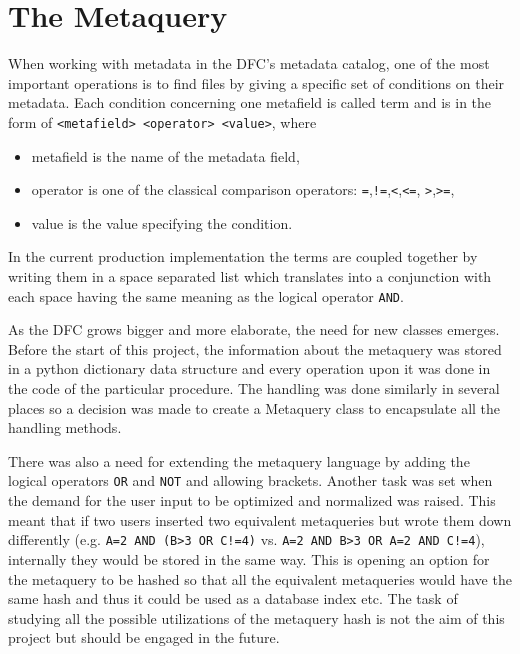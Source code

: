 \chapter{The Metaquery}
\label{chap:MQ}

When working with metadata in the DFC's metadata catalog, one of the most important operations is 
to find files by giving a specific set of conditions on their metadata. Each condition concerning
one metafield is called term and is in the form of \texttt{<metafield> <operator> <value>}, where
\begin{itemize}
\item metafield is the name of the metadata field,
\item operator is one of the classical comparison operators: \texttt{=},\texttt{!=},\texttt{<},\texttt{<=},
	\texttt{>},\texttt{>=}, 
\item value is the value specifying the condition.
\end{itemize}

In the current production implementation the terms are coupled 
together by writing them in a space separated list which translates into a conjunction with
each space having the same meaning as the logical operator \texttt{AND}.

As the DFC grows bigger and more elaborate, the need for new classes emerges. Before the 
start of this project, the information about the metaquery was stored in a python dictionary
data structure and every operation upon it was done in the code of the particular procedure. 
The handling was done similarly in several places so a decision was made to create a 
Metaquery class to encapsulate all the handling methods. 

There was also a need for extending the metaquery language by adding the logical operators 
\texttt{OR} and \texttt{NOT} and allowing brackets. Another task was set when the demand for
the user input to be optimized and normalized was raised. This meant that if two users 
inserted two equivalent metaqueries but wrote them down 
differently (e.g. \texttt{A=2 AND (B>3 OR C!=4)} vs. \texttt{A=2 AND B>3 OR A=2 AND C!=4}), 
internally they would be stored in the same way. This is opening an option for the metaquery 
to be hashed so that all the equivalent metaqueries would have the same hash and thus it 
could be used as a database index etc. The task of studying all the possible utilizations of the 
metaquery hash is not the aim of this project but should be engaged in the future. 


